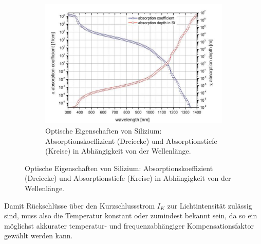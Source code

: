 \begin{figure}[H]
\begin{subfigure}[b]{0.55\textwidth}
    \caption{Silizium-Eindringtiefe-Licht \cite{laser}}
    \includegraphics[width=\textwidth]{img/Silizium-Eindringtiefe-Licht.png}
    \caption*{ Optische Eigenschaften von Silizium: Absorptionskoeffizient (Dreiecke) und Absorptionstiefe (Kreise) in Abhängigkeit von der Wellenlänge.}
  \label{fig:Silizium-eindingtiefe}
  \end{subfigure}
\end{figure}







\noindent Damit Rückschlüsse über den Kurzschlussstrom $I_K$ zur Lichtintensität zulässig sind, muss also die Temperatur konstant oder zumindest bekannt sein, da so ein möglichst akkurater temperatur- und frequenzabhängiger Kompensationsfaktor gewählt werden kann.
